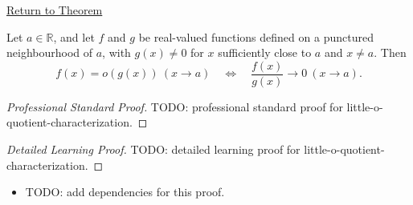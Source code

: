 \newpage
{}
\label{prf:little-o-quotient-characterization}

\begin{remark*}[Return]
\hyperref[prop:little-o-quotient-characterization]{Return to Theorem}
\end{remark*}

\begin{proposition*}
Let $a\in\mathbb{R}$, and let $f$ and $g$ be real-valued functions defined on a
punctured neighbourhood of $a$, with $g(x)\neq 0$ for $x$ sufficiently close to
$a$ and $x\neq a$. Then
\[
  f(x)=o(g(x))\ (x\to a)
  \quad\Longleftrightarrow\quad
  \frac{f(x)}{g(x)}\to 0\ (x\to a).
\]
\end{proposition*}

\begin{proof}[Professional Standard Proof]
\LRAProofBodyStart
TODO: professional standard proof for little-o-quotient-characterization.
\end{proof}

\begin{proof}[Detailed Learning Proof]
\LRAProofBodyStart
TODO: detailed learning proof for little-o-quotient-characterization.
\end{proof}

\begin{remark*}
\end{remark*}

\begin{dependencies}
\begin{itemize}
  \item TODO: add dependencies for this proof.
\end{itemize}
\end{dependencies}

\clearpage
